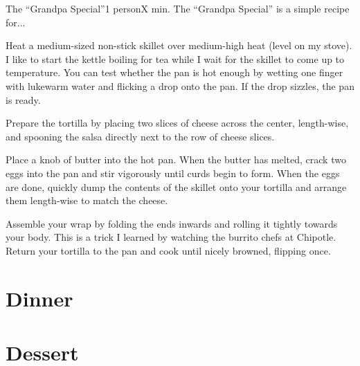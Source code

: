 \begin{recipe}{The \enquote{Grandpa Special}}{1 person}{X min.}
\freeform The \enquote{Grandpa Special} is a simple recipe for...

\newstep Heat a medium-sized non-stick skillet over medium-high heat (level
 on my stove).  I like to start the kettle boiling for tea while
I wait for the skillet to come up to temperature. You can test whether the pan
is hot enough by wetting one finger with lukewarm water and flicking a drop onto
the pan. If the drop sizzles, the pan is ready.

Prepare the tortilla by placing two slices of cheese across the center,
length-wise, and spooning the salsa directly next to the row of cheese
slices.

Place a knob of butter into the hot pan. When the butter has melted, crack
two eggs into the pan and stir vigorously until curds begin to form. When the
eggs are done, quickly dump the contents of the skillet onto your tortilla
and arrange them length-wise to match the cheese.

\newstep Assemble your wrap by folding the ends inwards and rolling
it tightly towards your body. This is a trick I learned by watching the
burrito chefs at Chipotle\texttrademark. Return your tortilla to the pan
and cook until nicely browned, flipping once.
\end{recipe}

\section{Dinner}
\label{sec:findlay-dinner}

\clearpage

\section{Dessert}
\label{sec:findlay-dessert}

\clearpage
